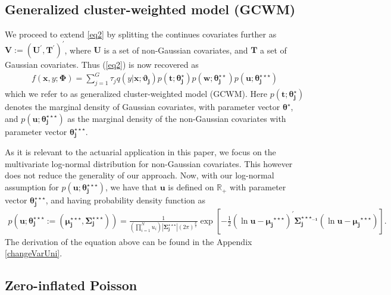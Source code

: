 \documentclass[11pt,letterpaper]{article}
\numberwithin{equation}{section}
\numberwithin{equation}{section}
\numberwithin{equation}{section}
\begin{document}
\subsection{Generalized cluster-weighted model (GCWM) }
We proceed to extend \eqref{eq2} by splitting the  continues covariates further as $\bm{V}:=(\bm U^{'}, \bm T^{'})^{'}$, where $\bm{U}$ is a set of non-Gaussian covariates, and $\bm{T}$ a set of Gaussian  covariates.  Thus (\ref{eq2}) is now recovered as 
\begin{align}
 f(\bm x, y; \bm{\Phi})= \sum_{j=1}^{G} \tau_j q(y|\bm{x};\bm{\vartheta_j})p(\bm{t};\bm{\theta_j^{\star}})p(\bm{w};\bm{\theta_j^{\star\star}})p(\bm{u};\bm{\theta_j^{\star\star\star}})
\label{eq3}
\end{align}
which we refer to as generalized cluster-weighted model (GCWM). Here $p(\bm{t};\bm{\theta_j^{\star}})$ denotes the marginal density of Gaussian covariates, with parameter vector $\bm{\theta^{\star}}$, and $p(\bm{u};\bm{\theta_j^{\star\star\star}})$ as the marginal density of the non-Gaussian covariates with parameter vector $ \bm{ \theta_j^{\star\star\star}} $.


As it is relevant to the actuarial application in this paper, we focus on the multivariate log-normal distribution  for non-Gaussian covariates. This however does not reduce the generality of our approach. Now, with our log-normal assumption for $p(\bm{u};\bm{\theta_j^{\star\star\star}})$, we have that $\bm{u}$ is defined on $\mathbb{R}_+$ with parameter vector $ \bm{\theta_j^{\star\star\star}} $, and having probability density function as
\begin{align} p \left(  \bm{u}; \bm{\theta_j^{\star\star\star}} := ( \bm{\mu_j^{\star\star\star}} ,\bm{ \Sigma _j^{\star\star\star }} ) \right) = \frac{1}{(\prod_{i=1}^{N}u_{i})|\bm{ \Sigma_j^{\star\star\star}} |(2 \pi)^{\frac{p}{2}}}   \exp\left[-\frac{1}{2}(\ln\bm{ u}-\bm{\mu_j}^{\star\star\star})^{'}\bm{\Sigma_j^{{\star\star\star}_{-1}}}(\ln \bm {u}-\bm{\mu_j}^{\star\star\star})\right].
\end{align} The derivation of the equation above can be found in the Appendix \ref{changeVarUni}.


\subsection{Zero-inflated Poisson}%
\end{document}
